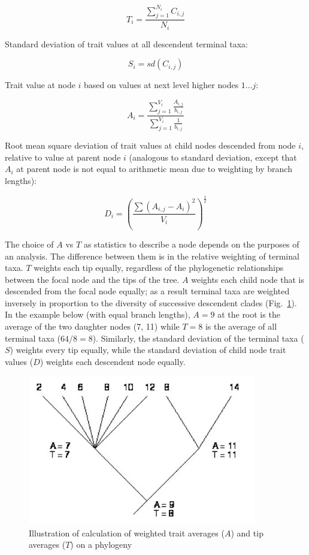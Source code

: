 \documentclass[12pt,letterpaper]{article}
\begin{document}
\[T_i = \frac{\sum_{j=1}^{N_i} C_{i,j}}{N_i}\]


Standard deviation of trait values at all descendent terminal taxa:

\[S_i = sd(C_{i,j})\]

Trait value at node $i$ based on values at next level
  higher nodes $1...j$:

\[A_i = \frac{\sum_{j=1}^{V_i}
  \frac{A_{i,j}}{b_{i,j}}}{\sum_{j=1}^{V_i} \frac{1}{b_{i,j}}}\]

Root mean square deviation of trait
  values at child nodes descended from node $i$, relative to value at
  parent node $i$ (analogous to standard deviation, except that $A_i$
  at parent node is not equal to arithmetic mean due to weighting by
  branch lengths):

\[D_i = \left( \frac{\sum (A_{i,j} - A_i)^2}{V_i}  \right)
^{\frac{1}{2}} \]

The choice of $A$ vs $T$ as statistics to describe a
node depends on the purposes of an analysis. The difference between
them is in the relative weighting of terminal taxa. $T$
weights each tip equally, regardless of the phylogenetic relationships
between the focal node and the tips of the tree. $A$ weights
each child node that is descended from the focal node equally; as a
result terminal taxa are weighted inversely in proportion to the
diversity of successive descendent clades (Fig.~\ref{fig1}). In the
example below (with equal branch lengths), $A = 9$ at the root is the
average of the two daughter nodes (7, 11) while $T = 8$ is the average
of all terminal taxa ($64/8 = 8$). Similarly, the standard deviation of
the terminal taxa ($S$) weights every tip equally, while the standard
deviation of child node trait values ($D$) weights each descendent node
equally.

\begin{figure}[!ht]
\centering
\includegraphics[width=10cm]{img/fig1.jpg}
\caption{Illustration of calculation of weighted trait averages ($A$) and tip averages ($T$) on a phylogeny}
\label{fig1}
\end{figure}
\end{document}
